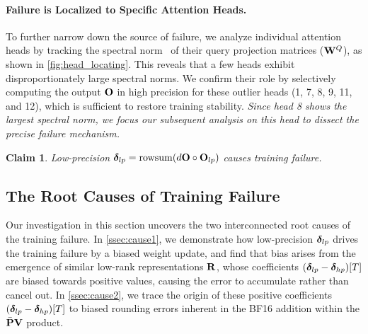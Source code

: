 \documentclass{article} %
\newtheorem{claim}{Claim}
\begin{document}
\vspace{-10px}
\paragraph{Failure is Localized to Specific Attention Heads.} To further narrow down the source of failure, we analyze individual attention heads by tracking the spectral norm~\citep{yang2023spectral,rybakov2024methods} of their query projection matrices (${\mathbf{W}}^Q$), as shown in \cref{fig:head_locating}. This reveals that a few heads exhibit disproportionately large spectral norms. We confirm their role by selectively computing the output ${\mathbf{O}}$ in high precision for these outlier heads (1, 7, 8, 9, 11, and 12), which is sufficient to restore training stability. \emph{Since head 8 shows the largest spectral norm, we focus our subsequent analysis on this head to dissect the precise failure mechanism.}


\begin{tcolorbox}[
  colback=cyan!5!white,      
  colframe=black!100,
  boxrule=0.4pt,
  arc=3pt,
  left=5pt, right=5pt,
  top=5pt, bottom=5pt,
  width=0.95\linewidth,
  coltitle=black,
  center
]
\begin{claim}\label{claim1}
Low-precision ${\boldsymbol{\delta}}_{lp} = \mathrm{rowsum}(d{\mathbf{O}} \circ {\mathbf{O}}_{lp})$ causes training failure.
\end{claim}
\end{tcolorbox}



\subsection{The Root Causes of Training Failure}\label{ssec:root_cause}


Our investigation in this section uncovers the two interconnected root causes of the training failure. In \cref{ssec:cause1}, we demonstrate how low-precision ${\boldsymbol{\delta}}_{lp}$ drives the training failure by a biased weight update, and find that bias arises from the emergence of similar low-rank representations ${\mathbf{R}}$, whose coefficients $({\boldsymbol{\delta}}_{lp} - {\boldsymbol{\delta}}_{hp})[T]$ are biased towards positive values, causing the error to accumulate rather than cancel out. In \cref{ssec:cause2}, we trace the origin of these positive coefficients $({\boldsymbol{\delta}}_{lp} - {\boldsymbol{\delta}}_{hp})[T]$ to biased rounding errors inherent in the BF16 addition within the $\bar{{\mathbf{P}}}{\mathbf{V}}$ product.
\end{document}

